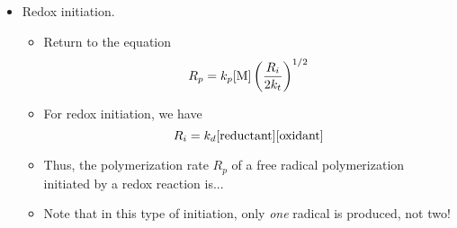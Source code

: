 \documentclass[../notes.tex]{subfiles}
\begin{document}
\begin{itemize}
\begin{itemize}
        \item Many redox reactions can be used to generate radicals which initiate polymerization.
        \item AdvantageA: Radical rpoduction occurs at a reasonable rate over a broad range of temperatures.
        \begin{itemize}
            \item Consequence: Lower temperatures are accessible (\SIrange{0}{50}{\celsius}) than with thermal homolysis of initiators.
        \end{itemize}
        \item Peroxides in combination with a reducing agent are frequently employed.
        \begin{itemize}
            \item Hydrogen peroxide + ferrous ion: .
            \item ...
            \item ...
            \item Other reductants can be employed instead of ; it depends on the system!
            \item Solubility can be an issue for these redox systems; these are mostly used in \emph{aqueous} or emulsion systems.
        \end{itemize}
        \item If you're thinking of doing a redox polymerization, there are some changes to the rate\dots
    \end{itemize}
    \item Redox initiation.
    \begin{itemize}
        \item Return to the equation
        \begin{equation*}
            R_p = k_p[\ce{M}]\left( \frac{R_i}{2k_t} \right)^{1/2}
        \end{equation*}
        \item For redox initiation, we have
        \begin{equation*}
            R_i = k_d[\text{reductant}][\ce{oxidant}]
        \end{equation*}
        \item Thus, the polymerization rate $R_p$ of a free radical polymerization initiated by a redox reaction is...
        \item Note that in this type of initiation, only \emph{one} radical is produced, not two!
    \end{itemize}

\end{itemize}
\end{document}
